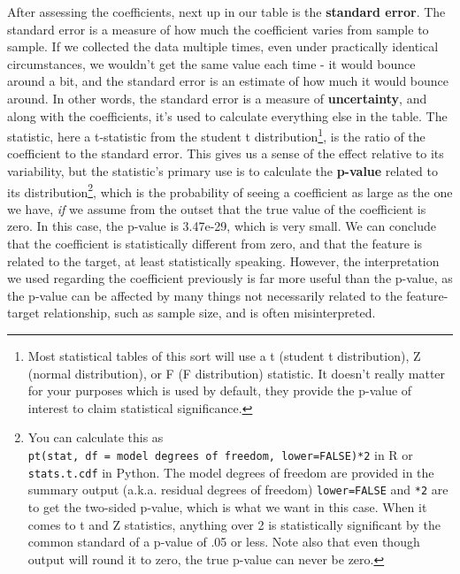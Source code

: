 \documentclass[
  letterpaper,
]{krantz}
\begin{document}
After assessing the coefficients, next up in our table is the
\textbf{standard error}. The standard error is a measure of how much the
coefficient varies from sample to sample. If we collected the data
multiple times, even under practically identical circumstances, we
wouldn't get the same value each time - it would bounce around a bit,
and the standard error is an estimate of how much it would bounce
around. In other words, the standard error is a measure of
\textbf{uncertainty}, and along with the coefficients, it's used to
calculate everything else in the table. The statistic, here a
t-statistic from the student t distribution\footnote{Most statistical
  tables of this sort will use a t (student t distribution), Z (normal
  distribution), or F (F distribution) statistic. It doesn't really
  matter for your purposes which is used by default, they provide the
  p-value of interest to claim statistical significance.}, is the ratio
of the coefficient to the standard error. This gives us a sense of the
effect relative to its variability, but the statistic's primary use is
to calculate the \textbf{p-value} related to its
distribution\footnote{You can calculate this as
  \texttt{pt(stat,\ df\ =\ model\ degrees\ of\ freedom,\ lower=FALSE)*2}
  in R or \texttt{stats.t.cdf} in Python. The model degrees of freedom
  are provided in the summary output (a.k.a. residual degrees of
  freedom) \texttt{lower=FALSE} and \texttt{*2} are to get the two-sided
  p-value, which is what we want in this case. When it comes to t and Z
  statistics, anything over 2 is statistically significant by the common
  standard of a p-value of .05 or less. Note also that even though
  output will round it to zero, the true p-value can never be zero.},
which is the probability of seeing a coefficient as large as the one we
have, \emph{if} we assume from the outset that the true value of the
coefficient is zero. In this case, the p-value is 3.47e-29, which is
very small. We can conclude that the coefficient is statistically
different from zero, and that the feature is related to the target, at
least statistically speaking. However, the interpretation we used
regarding the coefficient previously is far more useful than the
p-value, as the p-value can be affected by many things not necessarily
related to the feature-target relationship, such as sample size, and is
often misinterpreted.
\end{document}
